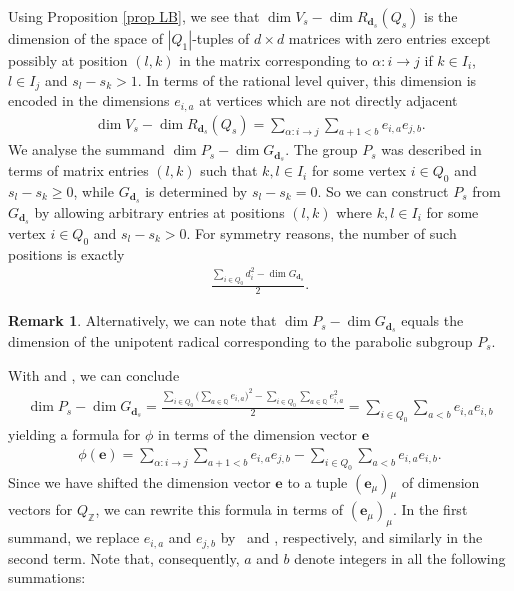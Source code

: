 \documentclass[pdftex]{sigma}
\numberwithin{equation}{section}
\theoremstyle{definition}
\newtheorem{Remark}[Theorem]{Remark}
\begin{document}
Using Proposition \ref{prop LB}, we see that $ \dim V_s - \dim R_{\mathbf{d}_s} (Q_s)$ is the dimension of the space of $|Q_1|$-tuples of $d\times d$ matrices with zero entries except possibly at position $(l,k)$ in the matrix corresponding to $\alpha\colon i\rightarrow j$ if $k\in I_i$, $l\in I_{j}$ and $s_l - s_k > 1$. In terms of the rational level quiver, this dimension is encoded in the dimensions $e_{i,a}$ at vertices which are not directly adjacent
\begin{align*}
\dim V_s - \dim R_{\mathbf{d}_s} (Q_s) = \sum_{\alpha\colon i \rightarrow j} \sum_{a+1<b} e_{i,a} e_{j,b} .
\end{align*}
We analyse the summand $\dim P_s - \dim G_{\mathbf{d}_s}$. The group $P_s$ was described in terms of matrix entries $(l,k)$ such that $k,l\in I_i$ for some vertex $i\in Q_0$ and $s_l - s_k \geq 0$, while $G_{\mathbf{d}_s}$ is determined by $s_l - s_k = 0$. So we can construct $P_s$ from $G_{\mathbf{d}_s}$ by allowing arbitrary entries at positions $(l,k)$ where $k,l\in I_i$ for some vertex $i\in Q_0$ and $s_l - s_k > 0$. For symmetry reasons, the number of such positions is exactly
\begin{align*}
\frac {\sum_{i\in Q_0} d_i^2 - \dim G_{\mathbf{d}_s}}{2} .
\end{align*}
\begin{Remark}
Alternatively, we can note that $\dim P_s - \dim G_{\mathbf{d}_s}$ equals the dimension of the unipotent radical corresponding to the parabolic subgroup $P_s$.
\end{Remark}
With  and , we can conclude
\begin{align*}
\dim P_s - \dim G_{\mathbf{d}_s} = \frac{\sum_{ i \in Q_0} \bigl(\sum_{a \in \mathbb{Q}} e_{i,a}\bigr)^2 - \sum_{ i \in Q_0} \sum_{a \in \mathbb{Q}} e_{i,a}^2 } {2} = \sum_{i \in Q_0} \sum_{a < b} e_{i,a} e_{i,b}
\end{align*}
yielding a formula for $\phi$ in terms of the dimension vector $\mathbf{e}$
\begin{align*}
\phi(\mathbf{e}) = \sum_{\alpha\colon i \rightarrow j} \sum_{a+1 <b} e_{i,a} e_{j,b} - \sum_{ i \in Q_0} \sum_{a < b} e_{i,a} e_{i,b} .
\end{align*}
Since we have shifted the dimension vector $\mathbf{e}$ to a tuple $(\mathbf{e}_{\mu})_\mu$ of dimension vectors for $Q_\mathbb{Z}$, we can rewrite this formula in terms of $(\mathbf{e}_{\mu})_{\mu}$. In the first summand, we replace $e_{i,a}$ and $e_{j,b}$ by~ and , respectively, and similarly in the second term. Note that, consequently, $a$ and $b$ denote integers in all the following summations:
\end{document}
